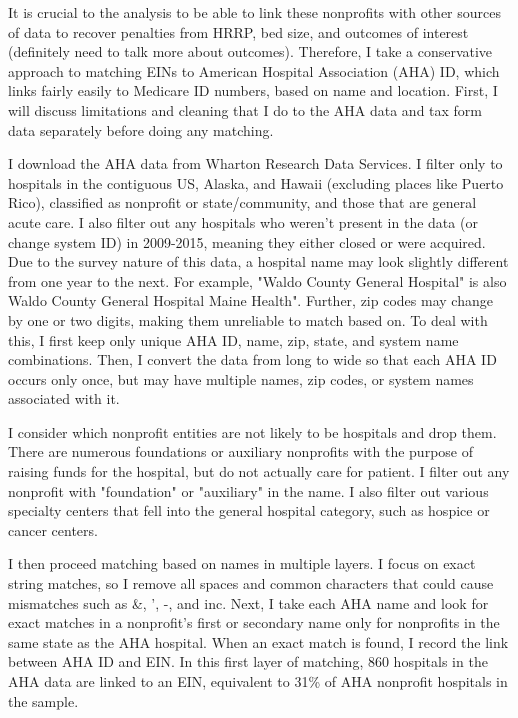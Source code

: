 \documentclass[12pt]{article}
\begin{document}
    It is crucial to the analysis to be able to link these nonprofits with other sources of data to recover penalties from HRRP, bed size, and outcomes of interest (definitely need to talk more about outcomes). Therefore, I take a conservative approach to matching EINs to American Hospital Association (AHA) ID, which links fairly easily to Medicare ID numbers, based on name and location. First, I will discuss limitations and cleaning that I do to the AHA data and tax form data separately before doing any matching. 

    I download the AHA data from Wharton Research Data Services. I filter only to hospitals in the contiguous US, Alaska, and Hawaii (excluding places like Puerto Rico), classified as nonprofit or state/community, and those that are general acute care. I also filter out any hospitals who weren't present in the data (or change system ID) in 2009-2015, meaning they either closed or were acquired. Due to the survey nature of this data, a hospital name may look slightly different from one year to the next. For example, "Waldo County General Hospital" is also Waldo County General Hospital Maine Health". Further, zip codes may change by one or two digits, making them unreliable to match based on. To deal with this, I first keep only unique AHA ID, name, zip, state, and system name combinations. Then, I convert the data from long to wide so that each AHA ID occurs only once, but may have multiple names, zip codes, or system names associated with it.

    I consider which nonprofit entities are not likely to be hospitals and drop them. There are numerous foundations or auxiliary nonprofits with the purpose of raising funds for the hospital, but do not actually care for patient. I filter out any nonprofit with "foundation" or "auxiliary" in the name. I also filter out various specialty centers that fell into the general hospital category, such as hospice or cancer centers. 

    I then proceed matching based on names in multiple layers. I focus on exact string matches, so I remove all spaces and common characters that could cause mismatches such as \&, ', -, and inc. Next, I take each AHA name and look for exact matches in a nonprofit's first or secondary name only for nonprofits in the same state as the AHA hospital. When an exact match is found, I record the link between AHA ID and EIN. In this first layer of matching, 860 hospitals in the AHA data are linked to an EIN, equivalent to 31\% of AHA nonprofit hospitals in the sample. 
\end{document}
